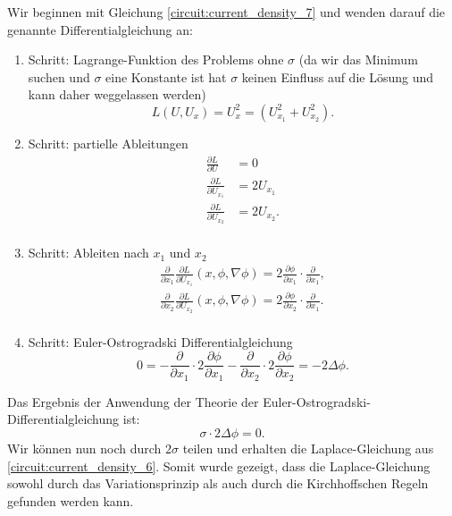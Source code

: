 Wir beginnen mit Gleichung \eqref{circuit:current_density_7} und wenden darauf die genannte Differentialgleichung an:
\begin{enumerate}
	\item Schritt: Lagrange-Funktion des Problems ohne $\sigma$ (da wir das Minimum suchen und $\sigma$ eine Konstante ist hat $\sigma$ keinen Einfluss auf die Lösung und kann daher weggelassen werden)
	\begin{equation}
		L(U, U_x)= U_x^2 = (U_{x_1}^2+U_{x_2}^2).
	\end{equation}
	\item Schritt: partielle Ableitungen
	\begin{equation}
		\begin{aligned}
			\frac{\partial L}{\partial U}&=0\\
			\frac{\partial L}{\partial U_{x_1}}&=2U_{x_1}\\
			\frac{\partial L}{\partial U_{x_2}}&=2U_{x_2}.\\
		\end{aligned}
	\end{equation}
	\item Schritt: Ableiten nach $x_1$ und $x_2$
	\begin{equation}
		\begin{aligned}
			\frac{\partial}{\partial x_1}\frac{\partial L}{\partial U_{x_1}}(x,\phi,\nabla \phi)=2\frac{\partial \phi}{\partial {x_1}}\cdot \frac{\partial}{\partial x_1},\\
			\frac{\partial}{\partial x_2}\frac{\partial L}{\partial U_{x_2}}(x,\phi,\nabla \phi)=2\frac{\partial \phi}{\partial {x_2}} \cdot \frac{\partial}{\partial x_1}.\\
		\end{aligned}
	\end{equation}
	\item Schritt: Euler-Ostrogradski Differentialgleichung
	\begin{equation}
		0=-\frac{\partial}{\partial x_1}\cdot 2\frac{\partial \phi}{\partial {x_1}}-\frac{\partial}{\partial x_2}\cdot 2\frac{\partial \phi}{\partial {x_2}}=-2\Delta\phi.
	\end{equation}
\end{enumerate}

Das Ergebnis der Anwendung der Theorie der Euler-Ostrogradski-Differentialgleichung ist:
	\begin{equation}
	\sigma \cdot 2\Delta\phi=0.
	\end{equation}
Wir können nun noch durch $2\sigma$ teilen und erhalten die Laplace-Gleichung aus \eqref{circuit:current_density_6}. Somit wurde gezeigt, dass die Laplace-Gleichung sowohl durch das Variationsprinzip als auch durch die Kirchhoffschen Regeln gefunden werden kann.



